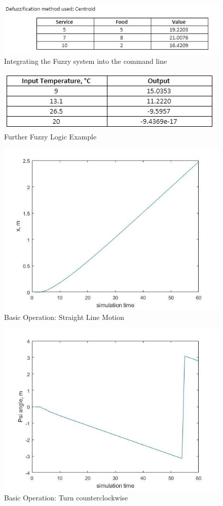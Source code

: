\documentclass{l4proj}
\begin{document}
\begin{figure}[htb]
    \centering
    \includegraphics[width=0.5\linewidth]{images/Table2.JPG}    

    \caption{Integrating the Fuzzy system into the command line 
    }

    \label{fig:model1} 
\end{figure}

\begin{figure}[htb]
    \centering
    \includegraphics[width=0.5\linewidth]{images/table3.JPG}

    \caption{Further Fuzzy Logic Example 
    }

    \label{fig:Model1sim1} 
\end{figure}
\begin{figure}[htb]
    \centering
    \includegraphics[width=0.5\linewidth]{images/Basic1.jpg}

    \caption{Basic Operation: Straight Line Motion
    }

    \label{fig:Model1sim1} 
\end{figure}
\begin{figure}[htb]
    \centering
    \includegraphics[width=0.5\linewidth]{images/Basic2.jpg}

    \caption{Basic Operation: Turn counterclockwise
    }
    \label{fig:Model1sim2} 
\end{figure}
\end{document}
